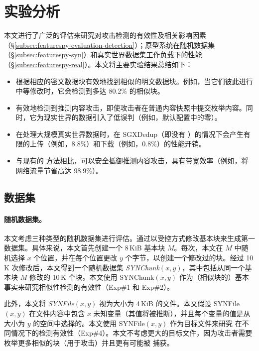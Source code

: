 \section{实验分析}
\label{sec:featurespy-evaluation}

本文进行了广泛的评估来研究\sysnameF 对攻击检测的有效性及相关影响因素（\S\ref{subsec:featurespy-evaluation-detection}）；原型系统\prototype 在随机数据集（\S\ref{subsec:featurespy-syn}）和真实世界数据集工作负载下的性能（\S\ref{subsec:featurespy-real}）。本文将主要实验结果总结如下：

\begin{itemize}[leftmargin=*]
\item \sysnameF 根据相应的密文数据块有效地找到相似的明文数据块。例如，当它们彼此进行中等修改时，它会检测到多达 80.2\% 的相似块。
\item \sysnameF 有效地检测到推测内容攻击，即使攻击者在普通内容快照中提交枚举内容。同时，它为现实世界的数据引入了低误判（例如，默认配置中的零）。
\item \prototype 在处理大规模真实世界数据时，在 SGXDedup（即没有 \sysnameF）的情况下会产生有限的上传（例如，8.8\%）和下载（例如，0.8\%）的性能开销。
\item 与现有的 \cite{harnik2010side, li15} 方法相比，可以安全抵御推测内容攻击，\prototype 具有带宽效率（例如，将网络流量节省高达 98.9\%）。
\end{itemize}


\subsection{数据集}
\label{subsec:featurespy-datasets}

\paragraph*{随机数据集。}

本文考虑三种类型的随机数据集进行评估。通过以受控方式修改基本块来生成第一数据集。具体来说，本文首先创建一个 8\,KiB 基本块 $M$。每次，本文在 $M$ 中随机选择 $x$ 个位置，并在每个位置更改 $y$ 个字节，以创建一个修改过的块。经过 10\,K 次修改后，本文得到一个随机数据集 {\em SYNChunk}$(x, y)$，其中包括从同一个基本块 $M$ 修改的 10\,K 个块。本文使用 SYNChunk$(x, y)$ 作为（相似块的）基本事实来研究相似性检测的有效性（Exp\#1 和 Exp\#2）。

此外，本文将 {\em SYNFile}$(x, y)$ 视为大小为 4\,KiB 的文件。本文假设 SYNFile$(x, y)$ 在文件内容中包含 $x$ 未知变量（其值将被推断），并且每个变量的值是从大小为 $y$ 的空间中选择的。本文使用 SYNFile$(x, y)$ 作为目标文件来研究 \sysnameF 在不同情况下的检测有效性（Exp\#4）。本文不考虑更大的目标文件，因为攻击者需要枚举更多相似的块（用于攻击）并且更有可能被 \sysnameF 捕获。

